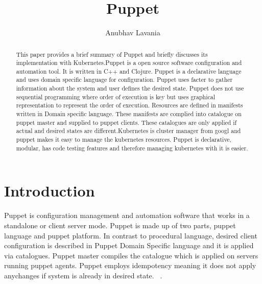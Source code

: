 \title{Puppet}


\author{Anubhav Lavania}


\renewcommand{\shortauthors}{G. v. Laszewski}


\begin{abstract}
  This paper provides a brief summary of Puppet and briefly discusses its
  implementation with Kubernetes.Puppet is a open source software configuration
  and automation tool. It is written in C++ and Clojure. Puppet is a declarative
  language and uses domain specific language for configuration. Puppet uses
  facter to gather information about the system and user defines the desired
  state. Puppet does not use sequential programming where order of execution is
  key but uses graphical representation to represent the order of
  execution. Resources are defined in manifests written in Domain specific
  language. These manifests are complied into catalogue on puppet master and
  supplied to puppet clients. These catalogues are only applied if actual and
  desired states are different.Kubernetes is cluster manager from googl and
  puppet makes it easy to manage the kubernetes resources. Puppet is
  declarative, modular, has code testing features and therefore managing
  kubernetes with it is easier.
\end{abstract}



\maketitle



\section{Introduction}

Puppet is configuration management and automation software that works in a
standalone or client server mode. Puppet is made up of two parts, puppet
language and puppet platform. In contrast to procedural language, desired client
configuration is described in Puppet Domain Specific language and it is applied
via catalogues. Puppet master compiles the catalogue which is applied on servers
running puppet agents. Puppet employs idempotency meaning it does not apply anychanges if system is already in desired state.
~\cite{editor00}.

